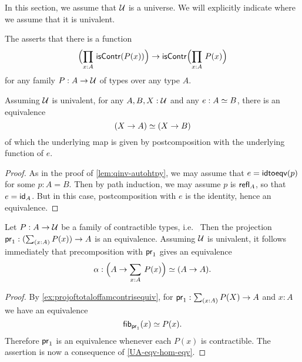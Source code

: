 In this section, we assume that $\type$ is a universe.
We will explicitly indicate where we assume that it is univalent.

\begin{defn}\label{weakfunext}
The  asserts that there is a function
\begin{equation*}
\Parens{\prd{x:A}\iscontr(P(x))} \to\iscontr\Parens{\prd{x:A}P(x)}
\end{equation*}
for any family $P:A\to\type$ of types over any type $A$.
\end{defn}

\begin{lem} \label{UA-eqv-hom-eqv}
Assuming $\type$ is univalent, for any $A,B,X:\type$ and any $e:\eqv{A}{B}$, there is an equivalence
\begin{equation*}
\eqv{(X\to A)}{(X\to B)}
\end{equation*}
of which the underlying map is given by postcomposition with the underlying function of $e$.
\end{lem}

\begin{proof}
  As in the proof of \autoref{lem:qinv-autohtpy}, we may assume that $e = \idtoeqv(p)$ for some $p:A=B$.
  Then by path induction, we may assume $p$ is $\refl{A}$, so that $e = \idfunc[A]$.
  But in this case, postcomposition with $e$ is the identity, hence an equivalence.
\end{proof}

\begin{cor}\label{contrfamtotalpostcompequiv}
Let $P:A\to\type$ be a family of contractible types, i.e.\ 
Then the projection $\proj{1}:(\sm{x:A}P(x))\to A$ is an equivalence. Assuming $\type$ is univalent, it follows immediately that precomposition with $\proj{1}$ gives an equivalence
\begin{equation*}
\alpha : \eqv{\Parens{A\to\sm{x:A}P(x)}}{(A\to A)}.
\end{equation*}
\end{cor}

\begin{proof}
  By \autoref{ex:projoftotaloffamcontrisequiv}, for $\proj{1}:\sm{x:A}P(X)\to A$ and $x:A$ we have an equivalence
  \begin{equation*}
    \eqv{\hfiber{\proj{1}}{x}}{P(x)}.
  \end{equation*}
  Therefore $\proj{1}$ is an equivalence whenever each $P(x)$ is contractible. The assertion is now a consequence of  \autoref{UA-eqv-hom-eqv}.
\end{proof}

